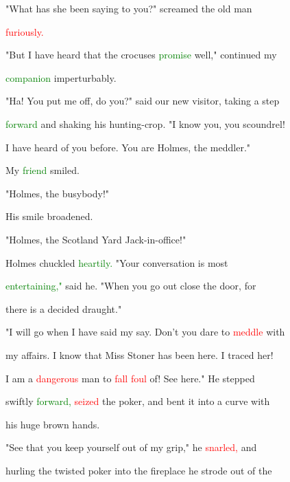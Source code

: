 "What has she been saying to you?" \textcolor{BurntOrange}{screamed} the old man

 \textcolor{red}{furiously.}



 "But I have heard that the crocuses \textcolor{green}{promise} well," continued my

 \textcolor{green}{companion} imperturbably.



 "Ha! You put me off, do you?" said our new \textcolor{BurntOrange}{visitor,} taking a step

 \textcolor{green}{forward} and shaking his hunting-crop. "I know you, you \textcolor{BurntOrange}{scoundrel!}

 I have heard of you before. You are Holmes, the meddler."



 My \textcolor{green}{friend} \textcolor{BurntOrange}{smiled.}



 "Holmes, the busybody!"



 His \textcolor{BurntOrange}{smile} broadened.



 "Holmes, the Scotland Yard Jack-in-office!"



 Holmes \textcolor{BurntOrange}{chuckled} \textcolor{green}{heartily.} "Your conversation is most

 \textcolor{green}{entertaining,"} said he. "When you go out close the door, for

 there is a decided draught."



 "I will go when I have said my say. Don't you \textcolor{BurntOrange}{dare} to \textcolor{red}{meddle} with

 my affairs. I know that Miss Stoner has been here. I traced her!

 I am a \textcolor{red}{dangerous} man to \textcolor{red}{fall} \textcolor{red}{foul} of! See here." He stepped

 swiftly \textcolor{green}{forward,} \textcolor{red}{seized} the poker, and bent it into a curve with

 his huge brown hands.



 "See that you keep yourself out of my grip," he \textcolor{red}{snarled,} and

 hurling the twisted poker into the fireplace he strode out of the

